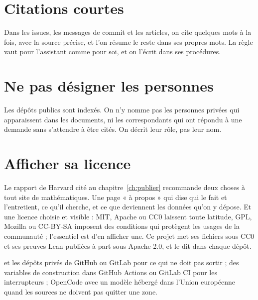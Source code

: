 \section{Citations courtes}

Dans les issues, les messages de commit et les articles, on cite quelques mots à la fois,
avec la source précise, et l'on résume le reste dans ses propres mots. La règle vaut pour
l'assistant comme pour soi, et on l'écrit dans ses procédures.

\section{Ne pas désigner les personnes}

Les dépôts publics sont indexés. On n'y nomme pas les personnes privées qui apparaissent
dans les documents, ni les correspondants qui ont répondu à une demande sans s'attendre à
être cités. On décrit leur rôle, pas leur nom.

\section{Afficher sa licence}

Le rapport de Harvard cité au chapitre~\ref{ch:publier} recommande deux choses à tout site
de mathématiques. Une page « à propos » qui dise qui le fait et l'entretient, ce qu'il
cherche, et ce que deviennent les données qu'on y dépose. Et une licence choisie et visible :
MIT, Apache ou CC0 laissent toute latitude, GPL, Mozilla ou CC-BY-SA imposent des
conditions qui protègent les usages de la communauté ; l'essentiel est d'en afficher une. Ce
projet met ses fichiers sous CC0 et ses preuves Lean publiées à part sous Apache-2.0, et le
dit dans chaque dépôt.

\begin{outils}
 et les dépôts privés de GitHub ou GitLab pour ce qui ne doit pas
sortir ; des variables de construction dans GitHub Actions ou GitLab CI pour les
interrupteurs ; OpenCode avec un modèle hébergé dans l'Union européenne quand les sources
ne doivent pas quitter une zone.
\end{outils}
